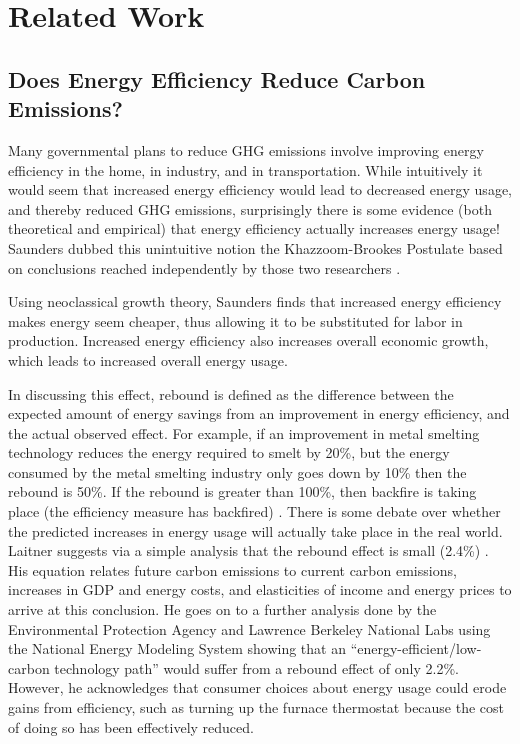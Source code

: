 \chapter{Related Work}


\section{Does Energy Efficiency Reduce Carbon Emissions?}
\label{sec:efficiency-rebound}

Many governmental plans to reduce GHG emissions involve improving energy efficiency in the home, in industry, and in transportation. While intuitively it would seem that increased energy efficiency would lead to decreased energy usage, and thereby reduced GHG emissions, surprisingly there is some evidence (both theoretical and empirical) that energy efficiency actually increases energy usage! Saunders dubbed this unintuitive notion the Khazzoom-Brookes Postulate based on conclusions reached independently by those two researchers \cite{saunders-1992}. 

Using neoclassical growth theory, Saunders finds that increased energy efficiency makes energy seem cheaper, thus allowing it to be substituted for labor in production. Increased energy efficiency also increases overall economic growth, which leads to increased overall energy usage.

In discussing this effect, rebound is defined as the difference between the expected amount of energy savings from an improvement in energy efficiency, and the actual observed effect. For example, if an improvement in metal smelting technology reduces the energy required to smelt by 20\%, but the energy consumed by the metal smelting industry only goes down by 10\% then the rebound is 50\%. If the rebound is greater than 100\%, then backfire is taking place (the efficiency measure has backfired) \cite{Hanley2008Do-increases-in}. There is some debate over whether the predicted increases in energy usage will actually take place in the real world. Laitner suggests via a simple analysis that the rebound effect is small (2.4\%) \cite{Skip-Laitner:2000yg}. His equation relates future carbon emissions to current carbon emissions, increases in GDP and energy costs, and elasticities of income and energy prices to arrive at this conclusion. He goes on to a further analysis done by the Environmental Protection Agency and Lawrence Berkeley National Labs using the National Energy Modeling System showing that an ``energy-efficient/low-carbon technology path'' would suffer from a rebound effect of only 2.2\%. However, he acknowledges that consumer choices about energy usage could erode gains from efficiency, such as turning up the furnace thermostat because the cost of doing so has been effectively reduced.


